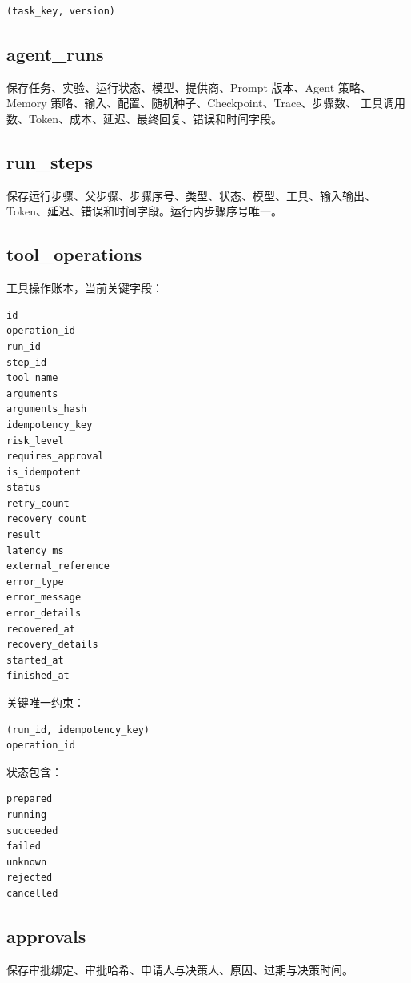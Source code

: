 \documentclass[11pt,a4paper]{ctexart}
\begin{document}
\begin{lstlisting}
(task_key, version)
\end{lstlisting}

\subsection{agent\_runs}

保存任务、实验、运行状态、模型、提供商、Prompt 版本、Agent 策略、
Memory 策略、输入、配置、随机种子、Checkpoint、Trace、步骤数、
工具调用数、Token、成本、延迟、最终回复、错误和时间字段。

\subsection{run\_steps}

保存运行步骤、父步骤、步骤序号、类型、状态、模型、工具、输入输出、
Token、延迟、错误和时间字段。运行内步骤序号唯一。

\subsection{tool\_operations}

工具操作账本，当前关键字段：

\begin{lstlisting}
id
operation_id
run_id
step_id
tool_name
arguments
arguments_hash
idempotency_key
risk_level
requires_approval
is_idempotent
status
retry_count
recovery_count
result
latency_ms
external_reference
error_type
error_message
error_details
recovered_at
recovery_details
started_at
finished_at
\end{lstlisting}

关键唯一约束：

\begin{lstlisting}
(run_id, idempotency_key)
operation_id
\end{lstlisting}

状态包含：

\begin{lstlisting}
prepared
running
succeeded
failed
unknown
rejected
cancelled
\end{lstlisting}

\subsection{approvals}

保存审批绑定、审批哈希、申请人与决策人、原因、过期与决策时间。
\end{document}
